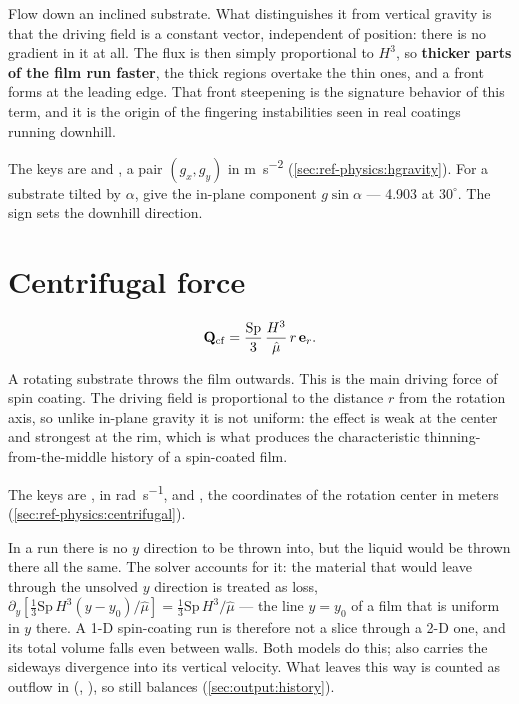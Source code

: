 Flow down an inclined substrate. What distinguishes it from vertical gravity is
that the driving field is a constant vector, independent of position: there is
no gradient in it at all. The flux is then simply proportional to $H^{3}$, so
\textbf{thicker parts of the film run faster}, the thick regions overtake the
thin ones, and a front forms at the leading edge. That front steepening is the
signature behavior of this term, and it is the origin of the fingering
instabilities seen in real coatings running downhill.

The keys are  and
, a pair $(g_x, g_y)$ in
\si{\metre\per\second\squared} (\cref{sec:ref-physics:hgravity}). For a
substrate tilted by $\alpha$, give the in-plane component $g\sin\alpha$ ---
\num{4.903} at $30^\circ$. The sign sets the downhill direction.

\section{Centrifugal force}
\label{sec:terms:centrifugal}

\begin{equation}\label{eq:q-cf}
  \mathbf{Q}_{\mathrm{cf}} = \frac{\mathrm{Sp}}{3}\,\frac{H^{3}}{\hat{\mu}}\,r\,\mathbf{e}_r.
\end{equation}

A rotating substrate throws the film outwards. This is the main driving force
of spin coating. The driving field is proportional to the distance $r$ from the
rotation axis, so unlike in-plane gravity it is not uniform: the effect is
weak at the center and strongest at the rim, which is what produces the
characteristic thinning-from-the-middle history of a spin-coated film.

The keys are ,
 in \si{\radian\per\second}, and
, the coordinates of the rotation center
in meters (\cref{sec:ref-physics:centrifugal}).

\begin{note}
  In a  run there is no $y$ direction to be thrown into, but the
  liquid would be thrown there all the same. The solver accounts for it: the
  material that would leave through the unsolved $y$ direction is treated as
  loss, $\partial_y[\tfrac13\mathrm{Sp}\,H^3(y-y_0)/\hat\mu] = \tfrac13\mathrm{Sp}\,H^3/\hat\mu$
  --- the line $y = y_0$ of a film that is uniform in $y$ there. A 1-D
  spin-coating run is therefore not a slice through a 2-D one, and its total
  volume falls even between walls. Both models do this;  also
  carries the sideways divergence into its vertical velocity. What leaves this
  way is counted as outflow in  (,
  ), so  still balances
  (\cref{sec:output:history}).
\end{note}

